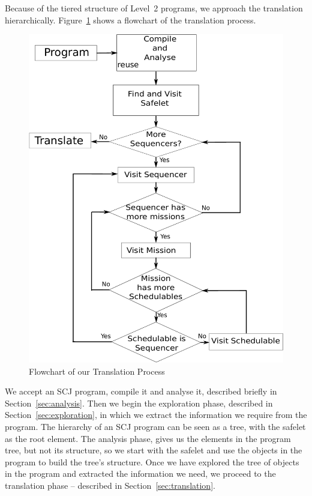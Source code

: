 \documentclass[10pt,a4paper]{article}
\begin{document}
Because of the tiered structure of Level~2 programs, we approach the translation hierarchically. Figure~\ref{fig:translationFlow} shows a flowchart of the translation process.
\begin{figure}[h!]
\begin{center}
\includegraphics[scale=0.5]{translation.pdf}
\caption{Flowchart of our Translation Process \label{fig:translationFlow} }
\end{center}
\end{figure}
We accept an SCJ program, compile it and analyse it, described briefly in Section~\ref{sec:analysis}. Then we begin the exploration phase, described in Section~\ref{sec:exploration}, in which we extract the information we require from the program. The hierarchy of an SCJ program can be seen as a tree, with the safelet as the root element. The analysis phase, gives us the elements in the program tree, but not its structure, so we start with the safelet and use the objects in the program to build the tree's structure. Once we have explored the tree of objects in the program and extracted the information we need, we proceed to the translation phase -- described in Section~\ref{sec:translation}.
\end{document}
